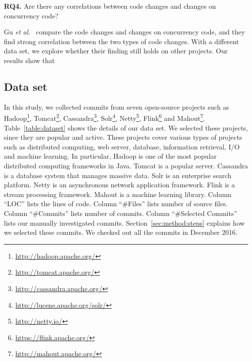 \textbf{RQ4.} Are there any correlations between code changes and changes on concurrency code?

Gu \emph{et al.}~\cite{conf/sigsoft/GuJSZL15} compare the code changes and changes on concurrency code, and they find strong correlation between the two types of code changes. With a different data set, we explore whether their finding still holds on other projects. Our results show that 

\subsection{Data set}
\label{sec:method:data}
In this study, we collected commits from seven open-source projects such as Hadoop\footnote{\url{http://hadoop.apache.org/}}, Tomcat\footnote{\url{http://tomcat.apache.org/}}, Cassandra\footnote{\url{http://cassandra.apache.org/}}, Solr\footnote{\url{http://lucene.apache.org/solr/}}, Netty\footnote{\url{http://netty.io/}}, Flink\footnote{\url{https://flink.apache.org/}} and Mahout\footnote{\url{http://mahout.apache.org/}}. Table~\ref{table:dataset} shows the details of our data set. We selected these projects, since they are popular and active. These projects cover various types of projects such as distributed computing, web server, database, information retrieval, I/O and machine learning. In particular, Hadoop is one of the most popular distributed computing frameworks in Java. Tomcat is a popular server. Cassandra is a database system that manages massive data. Solr is an enterprise search platform. Netty is an asynchronous network application framework. Flink is a stream processing framework. Mahout is a machine learning library. Column ``LOC'' lists the lines of code. Column ``\#Files'' lists number of source files. Column ``\#Commits'' lists number of commits. Column ``\#Selected Commits'' lists our manually investigated commits. Section~\ref{sec:method:steps} explains how we selected these commits. We checked out all the commits in December 2016.

